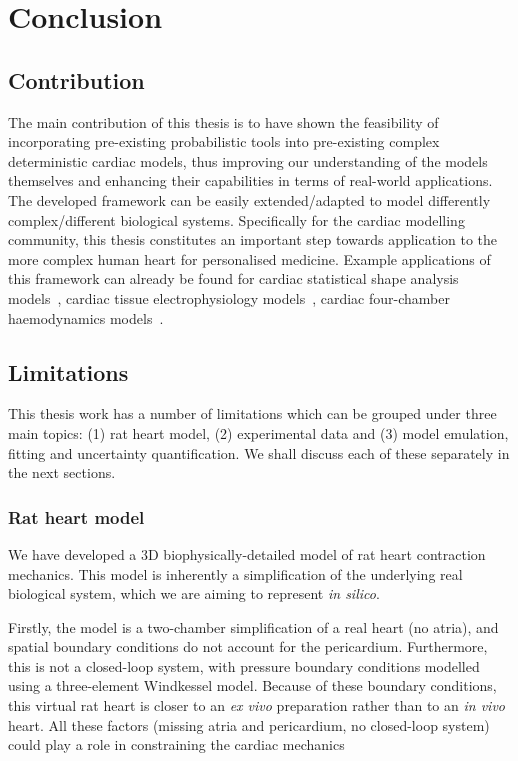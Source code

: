 \chapter{Conclusion}\label{cha:chapter9}
%
%
%
\section{Contribution}\label{sec:ch9contribution}
The main contribution of this thesis is to have shown the feasibility of incorporating pre-existing probabilistic tools into pre-existing complex deterministic cardiac models, thus improving our understanding of the models themselves and enhancing their capabilities in terms of real-world applications. The developed framework can be easily extended/adapted to model differently complex/different biological systems. Specifically for the cardiac modelling community, this thesis constitutes an important step towards application to the more complex human heart for personalised medicine. Example applications of this framework can already be found for cardiac statistical shape analysis models~\cite{Rodero:2021}, cardiac tissue electrophysiology models~\cite{Fassina:2022}, cardiac four-chamber haemodynamics models~\cite{Karabelas:2021}.


%
%
%
\section{Limitations}\label{sec:ch9limitations}
This thesis work has a number of limitations which can be grouped under three main topics: (1) rat heart model, (2) experimental data and (3) model emulation, fitting and uncertainty quantification. We shall discuss each of these separately in the next sections.


%
%
%
\subsection{Rat heart model}\label{sec:ch9rat_heart_model}
We have developed a $3$D biophysically-detailed model of rat heart contraction mechanics. This model is inherently a simplification of the underlying real biological system, which we are aiming to represent \textit{in silico}.

\vspace{0.2cm}
Firstly, the model is a two-chamber simplification of a real heart (no atria), and spatial boundary conditions do not account for the pericardium. Furthermore, this is not a closed-loop system, with pressure boundary conditions modelled using a three-element Windkessel model. Because of these boundary conditions, this virtual rat heart is closer to an \textit{ex vivo} preparation rather than to an \textit{in vivo} heart. All these factors (missing atria and pericardium, no closed-loop system) could play a role in constraining the cardiac mechanics~\cite{Strocchi:2020,Augustin:2021}

